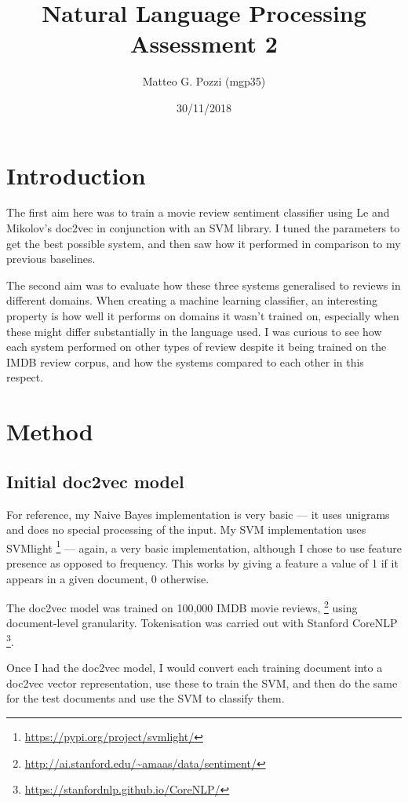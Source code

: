 \documentclass[12pt,a4paper,twoside]{article}
\title{%
  Natural Language Processing \\
  \large Assessment 2}
\author{Matteo G. Pozzi (mgp35)\vspace{-2ex}}
\date{30/11/2018\vspace{-2ex}}
\begin{document}
\maketitle


\section{Introduction}

The first aim here was to train a movie review sentiment classifier using Le and Mikolov's doc2vec in conjunction with an SVM library. I tuned the parameters to get the best possible system, and then saw how it performed in comparison to my previous baselines.

The second aim was to evaluate how these three systems generalised to reviews in different domains. When creating a machine learning classifier, an interesting property is how well it performs on domains it wasn't trained on, especially when these might differ substantially in the language used. I was curious to see how each system performed on other types of review despite it being trained on the IMDB review corpus, and how the systems compared to each other in this respect.

\section{Method}

\subsection{Initial doc2vec model}

For reference, my Naive Bayes implementation is very basic --- it uses unigrams and does no special processing of the input. My SVM implementation uses SVMlight \footnote{\url{https://pypi.org/project/svmlight/}} --- again, a very basic implementation, although I chose to use feature presence as opposed to frequency. This works by giving a feature a value of 1 if it appears in a given document, 0 otherwise.

The doc2vec model was trained on 100,000 IMDB movie reviews, \footnote{\url{http://ai.stanford.edu/~amaas/data/sentiment/}} using document-level granularity. Tokenisation was carried out with Stanford CoreNLP \footnote{\url{https://stanfordnlp.github.io/CoreNLP/}}.

Once I had the doc2vec model, I would convert each training document into a doc2vec vector representation, use these to train the SVM, and then do the same for the test documents and use the SVM to classify them.
\end{document}

